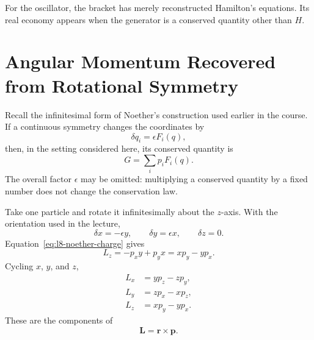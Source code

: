 \begin{classroomqa}
\end{classroomqa}

For the oscillator, the bracket has merely reconstructed Hamilton's equations.
Its real economy appears when the generator is a conserved quantity other than
\(H\).

\section{Angular Momentum Recovered from Rotational Symmetry}

Recall the infinitesimal form of Noether's construction used earlier in the
course.  If a continuous symmetry changes the coordinates by
\begin{equation}
  \delta q_i=\epsilon F_i(q),
  \label{eq:l8-noether-variation}
\end{equation}
then, in the setting considered here, its conserved quantity is
\begin{equation}
  G=\sum_i p_iF_i(q).
  \label{eq:l8-noether-charge}
\end{equation}
The overall factor \(\epsilon\) may be omitted: multiplying a conserved
quantity by a fixed number does not change the conservation law.

Take one particle and rotate it infinitesimally about the \(z\)-axis.  With the
orientation used in the lecture,
\begin{equation}
  \delta x=-\epsilon y,\qquad
  \delta y=\epsilon x,\qquad
  \delta z=0.
  \label{eq:l8-z-rotation}
\end{equation}
Equation~\eqref{eq:l8-noether-charge} gives
\begin{equation}
  L_z=-p_xy+p_yx=xp_y-yp_x.
  \label{eq:l8-lz}
\end{equation}
Cycling \(x\), \(y\), and \(z\),
\begin{equation}
  \boxed{\begin{aligned}
    L_x&=yp_z-zp_y,\\
    L_y&=zp_x-xp_z,\\
    L_z&=xp_y-yp_x.
  \end{aligned}}
  \label{eq:l8-angular-components}
\end{equation}
These are the components of
\begin{equation}
  \boldsymbol L=\boldsymbol r\times\boldsymbol p.
  \label{eq:l8-cross-product}
\end{equation}

